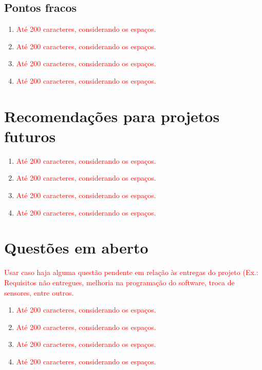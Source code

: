 \subsection{Pontos fracos}
\begin{enumerate}
	\item \textcolor{red}{Até 200 caracteres, considerando os espaços.}
	\item \textcolor{red}{Até 200 caracteres, considerando os espaços.}
	\item \textcolor{red}{Até 200 caracteres, considerando os espaços.}
	\item \textcolor{red}{Até 200 caracteres, considerando os espaços.}
\end{enumerate}

\section{Recomendações para projetos futuros}

\begin{enumerate}
	\item \textcolor{red}{Até 200 caracteres, considerando os espaços.}
	\item \textcolor{red}{Até 200 caracteres, considerando os espaços.}
	\item \textcolor{red}{Até 200 caracteres, considerando os espaços.}
	\item \textcolor{red}{Até 200 caracteres, considerando os espaços.}
\end{enumerate}

\section{Questões em aberto}

\textcolor{red}{Usar caso haja alguma questão pendente em relação às entregas do projeto (Ex.: Requisitos não entregues, melhoria na programação do software, troca de sensores, entre outros.}

\begin{enumerate}
	\item \textcolor{red}{Até 200 caracteres, considerando os espaços.}
	\item \textcolor{red}{Até 200 caracteres, considerando os espaços.}
	\item \textcolor{red}{Até 200 caracteres, considerando os espaços.}
	\item \textcolor{red}{Até 200 caracteres, considerando os espaços.}
\end{enumerate}


